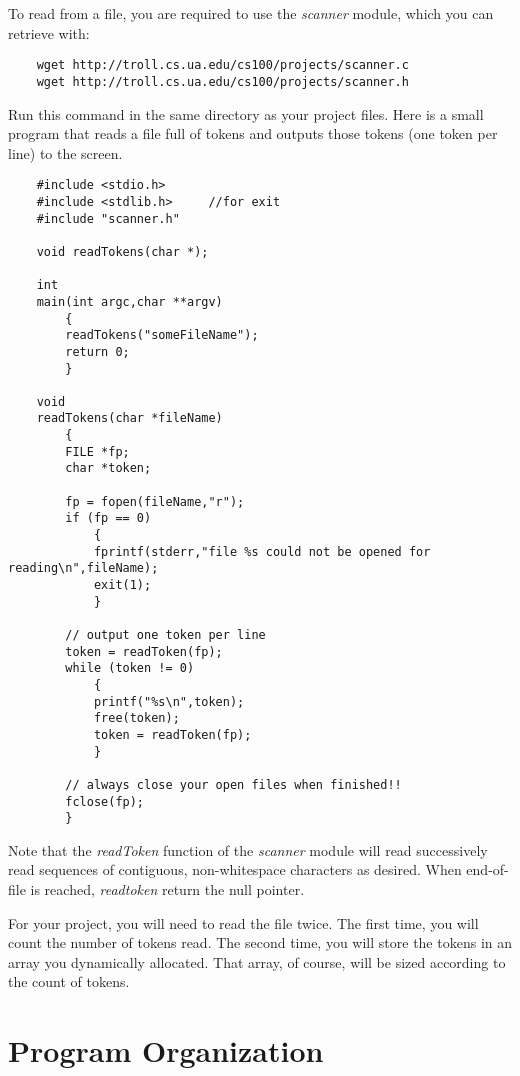 \documentclass[12pt]{article}
\begin{document}
To read from a file, you are required to use the {\it scanner} module, which
you can retrieve with:

\begin{verbatim}
    wget http://troll.cs.ua.edu/cs100/projects/scanner.c
    wget http://troll.cs.ua.edu/cs100/projects/scanner.h
\end{verbatim}

Run this command in the same directory as your project files.  Here is a
small program that reads a file full of tokens
and outputs those tokens 
(one token per line) to the screen.

\begin{verbatim}
    #include <stdio.h>
    #include <stdlib.h>     //for exit
    #include "scanner.h"

    void readTokens(char *);

    int
    main(int argc,char **argv)
        {
        readTokens("someFileName");
        return 0;
        }

    void
    readTokens(char *fileName)
        {
        FILE *fp;
        char *token;
        
        fp = fopen(fileName,"r");
        if (fp == 0)
            {
            fprintf(stderr,"file %s could not be opened for reading\n",fileName);
            exit(1);
            }

        // output one token per line
        token = readToken(fp);
        while (token != 0)
            {
            printf("%s\n",token);
            free(token);
            token = readToken(fp);
            }

        // always close your open files when finished!!
        fclose(fp);
        }
\end{verbatim}

Note that the {\it readToken} function of the {\it scanner}
module will read
successively read sequences of contiguous, non-whitespace
characters as desired. When end-of-file is reached, {\it readtoken}
return the null pointer.

For your project, you will need to read the file twice. The first time,
you will count the number of tokens read. The second time, you will
store the tokens in an array you dynamically allocated. That array,
of course, will be sized according to the count of tokens.

\section*{Program Organization}
\end{document}

